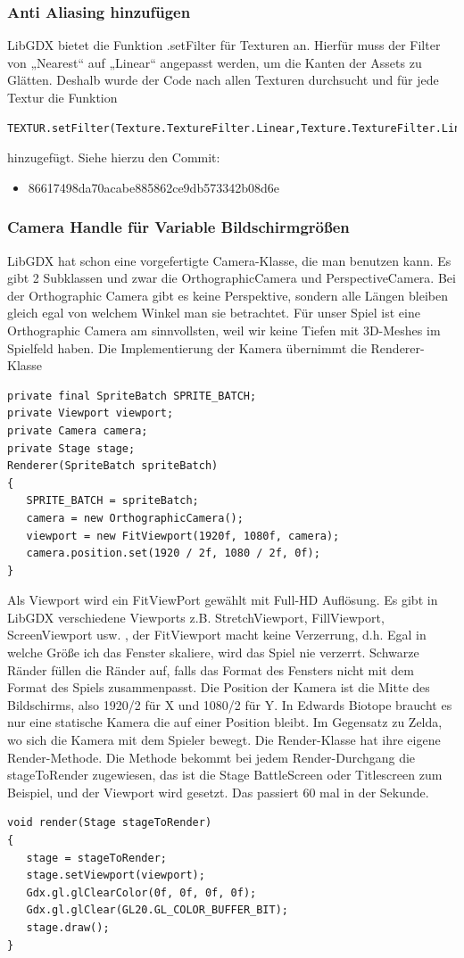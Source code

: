\subsubsection{Anti Aliasing hinzufügen}
LibGDX bietet die Funktion .setFilter für Texturen an. Hierfür muss der Filter von „Nearest“ auf „Linear“ angepasst werden, um die Kanten der Assets zu Glätten. Deshalb wurde der Code nach allen Texturen durchsucht und für jede Textur die Funktion
\begin{lstlisting}
TEXTUR.setFilter(Texture.TextureFilter.Linear,Texture.TextureFilter.Linear);
\end{lstlisting}
hinzugefügt.
Siehe hierzu den Commit:
\begin{itemize}
\item 86617498da70acabe885862ce9db573342b08d6e
\end{itemize}

\subsubsection{Camera Handle für Variable Bildschirmgrößen}
LibGDX hat schon eine vorgefertigte Camera-Klasse, die man benutzen kann. Es gibt 2 Subklassen und zwar die OrthographicCamera und PerspectiveCamera. Bei der Orthographic Camera gibt es keine Perspektive, sondern alle Längen bleiben gleich egal von welchem Winkel man sie betrachtet.
Für unser Spiel ist eine Orthographic Camera am sinnvollsten, weil wir keine Tiefen mit 3D-Meshes im Spielfeld haben.
Die Implementierung der Kamera übernimmt die Renderer-Klasse
\begin{lstlisting}
private final SpriteBatch SPRITE_BATCH;
private Viewport viewport;
private Camera camera;
private Stage stage;
Renderer(SpriteBatch spriteBatch)
{
   SPRITE_BATCH = spriteBatch;
   camera = new OrthographicCamera();
   viewport = new FitViewport(1920f, 1080f, camera);
   camera.position.set(1920 / 2f, 1080 / 2f, 0f);
}
\end{lstlisting}
Als Viewport wird ein FitViewPort gewählt mit Full-HD Auflösung. Es gibt in LibGDX verschiedene Viewports z.B. StretchViewport, FillViewport, ScreenViewport usw. , der FitViewport
macht keine Verzerrung, d.h. Egal in welche Größe ich das Fenster skaliere, wird das Spiel nie verzerrt. Schwarze Ränder füllen die Ränder auf, falls das Format des Fensters nicht mit dem Format des Spiels zusammenpasst. Die Position der Kamera ist die Mitte des Bildschirms, also 1920/2 für X und 1080/2 für Y. In Edwards Biotope braucht es nur eine statische Kamera die auf einer Position bleibt. Im Gegensatz zu Zelda, wo sich die Kamera mit dem Spieler bewegt.
Die Render-Klasse hat ihre eigene Render-Methode. Die Methode bekommt bei jedem Render-Durchgang die stageToRender zugewiesen, das ist die Stage BattleScreen oder Titlescreen zum Beispiel, und der Viewport wird gesetzt. Das passiert 60 mal in der Sekunde.
\begin{lstlisting}
void render(Stage stageToRender)
{
   stage = stageToRender;
   stage.setViewport(viewport);
   Gdx.gl.glClearColor(0f, 0f, 0f, 0f);
   Gdx.gl.glClear(GL20.GL_COLOR_BUFFER_BIT);
   stage.draw();
}
\end{lstlisting}

